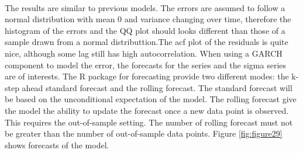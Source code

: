 \documentclass[12pt]{article}
\begin{document}
\paragraph{}
The results are similar to previous models. The errors are assumed to follow a normal distribution with mean 0 and variance changing over time, therefore the histogram of the errors and the QQ plot should looks different than those of a sample drawn from a normal distributtion.The acf plot of the residuals is quite nice, although some lag still has high autocorrelation. When using a GARCH component to model the error, the forecasts for the series and the sigma series are of interests. The R package for forecasting provide two different modes: the k-step ahead standard forecast and the rolling forecast. The standard forecast will be based on the unconditional expectation of the model. The rolling forecast give the model the ability to update the forecast once a new data point is observed. This requires the out-of-sample setting. The number of rolling forecast must not be greater than the number of out-of-sample data points. Figure \ref{fig:figure29} shows forecasts of the model.
\end{document}
